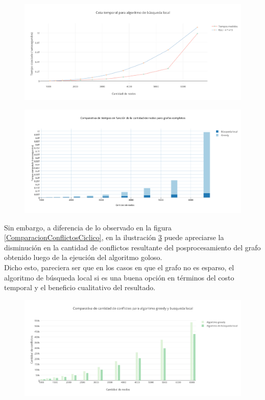  \begin{figure}[H]
    \centering
  	\includegraphics[width=18cm]{imagenes/Ej5/TiemposLocalCompleto.png}
    \caption{}
 	  \label{TiemposLocalCompleto}
  \end{figure}

 \begin{figure}[H]
    \centering
  	\includegraphics[width=18cm]{imagenes/Ej5/ComparacionTiemposCompleto.png}
    \caption{}
 	  \label{ComparacionTiemposCompleto}
  \end{figure}

Sin embargo, a diferencia de lo observado en la figura \ref{ComparacionConflictosCiclico}, en la ilustración \ref{ComparacionConflictosCompleto} puede apreciarse la disminución en la cantidad de conflictos resultante del posprocesamiento del grafo obtenido luego de la ejeución del algoritmo goloso.\\
Dicho esto, pareciera ser que en los casos en que el grafo no es esparso, el algoritmo de búsqueda local si es una buena opción en términos del costo temporal y el beneficio cualitativo del resultado.

 \begin{figure}[H]
    \centering
  	\includegraphics[width=18cm]{imagenes/Ej5/ComparacionConflictosCompleto.png}
    \caption{}
 	  \label{ComparacionConflictosCompleto}
  \end{figure}

